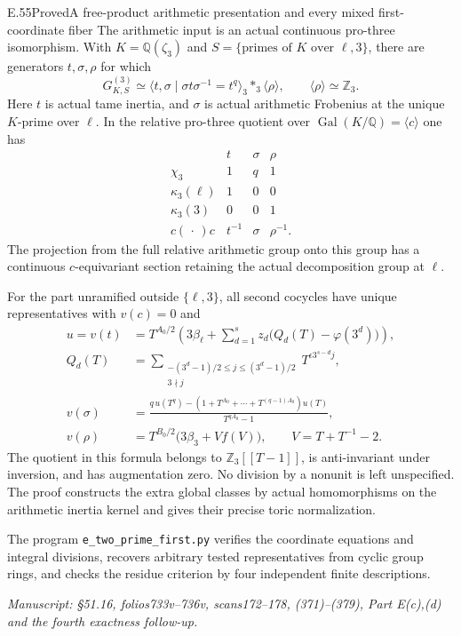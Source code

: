 \begin{statement}{E.55}{Proved}{A free-product arithmetic presentation and every mixed first-coordinate fiber}
The arithmetic input is an actual continuous pro-three
isomorphism. With $K=\mathbb Q(\zeta_3)$ and
$S=\{\text{primes of }K\text{ over }\ell,3\}$, there are
generators $t,\sigma,\rho$ for which
\[
 G_{K,S}^{(3)}\simeq
 \langle t,\sigma\mid\sigma t\sigma^{-1}=t^q\rangle_{\!3}
                  \mathop{\ast}_{3}\langle\rho\rangle,
 \qquad \langle\rho\rangle\simeq\mathbb Z_3.                 \tag{E55.5}
\]
Here $t$ is actual tame inertia, and $\sigma$ is actual
arithmetic Frobenius at the unique $K$-prime over $\ell$.
In the relative pro-three quotient over
$\operatorname{Gal}(K/\mathbb Q)=\langle c\rangle$ one has
\[
 \begin{array}{c|ccc}
       &t&\sigma&\rho\\\hline
 \chi_3&1&q&1\\
 \kappa_3(\ell)&1&0&0\\
 \kappa_3(3)&0&0&1\\
 c(\,\cdot\,)c&t^{-1}&\sigma&\rho^{-1}.
 \end{array}                                                \tag{E55.6}
\]
The projection from the full relative arithmetic group onto
this group has a continuous $c$-equivariant section retaining
the actual decomposition group at $\ell$.

For the part unramified outside $\{\ell,3\}$, all second
cocycles have unique representatives with $v(c)=0$ and
\[
 \begin{split}
 u=v(t)&=T^{A_0/2}\left(3\beta_\ell+
            \sum_{d=1}^s z_d\bigl(Q_d(T)-\varphi(3^d)\bigr)\right),\\
 Q_d(T)&=\sum_{\substack{-(3^d-1)/2\le j\le(3^d-1)/2\\3\nmid j}}
                     T^{\epsilon3^{s-d}j},\\
 v(\sigma)&=
 \frac{q\,u(T^q)-(1+T^{A_0}+\cdots+T^{(q-1)A_0})u(T)}
                                      {T^{qA_0}-1},\\
 v(\rho)&=T^{B_0/2}\bigl(3\beta_3+Vf(V)\bigr),
                    \qquad V=T+T^{-1}-2.
 \end{split}                                                \tag{E55.7}
\]
The quotient in this formula belongs to $\mathbb Z_3[[T-1]]$,
is anti-invariant under inversion, and has augmentation zero.
No division by a nonunit is left unspecified.
The proof constructs the extra global classes by actual
homomorphisms on the arithmetic inertia kernel and gives their
precise toric normalization.

The program \texttt{e\_two\_prime\_first.py} verifies the
coordinate equations and integral divisions, recovers arbitrary
tested representatives from cyclic group rings, and checks the
residue criterion by four independent finite descriptions.

\emph{Manuscript: \S51.16, folios733v--736v, scans172--178,
(371)--(379), Part E(c),(d) and the fourth exactness follow-up.}
\end{statement}
